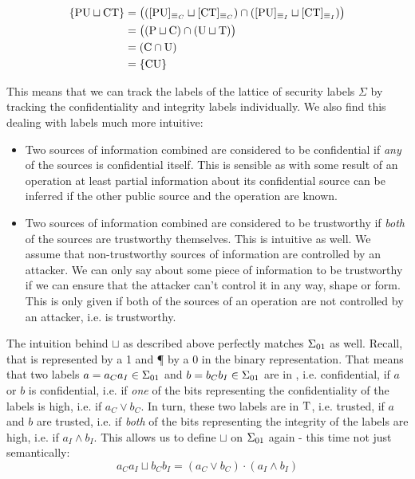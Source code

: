\begin{example}
    \begin{align*}
        \{ \text{PU} \sqcup \text{CT} \} &= \big(([\text{PU}]_{\equiv_C} \sqcup [\text{CT}]_{\equiv_C}) \cap ([\text{PU}]_{\equiv_I} \sqcup [\text{CT}]_{\equiv_I}) \big) \\
        &= \big((\text{P} \sqcup \text{C}) \cap (\text{U} \sqcup \text{T}) \big) \\
        &= (\text{C} \cap \text{U}) \\
        &= \{ \text{CU} \}
    \end{align*}
\end{example}

This means that we can track the labels of the lattice of security labels $ \Sigma $ by tracking the confidentiality and integrity labels individually.
We also find this dealing with labels much more intuitive:
\begin{itemize}
    \item Two sources of information combined are considered to be confidential if \textit{any} of the sources is confidential itself.
    This is sensible as with some result of an operation at least partial information about its confidential source can be inferred if the other public source and the operation are known.
    \item Two sources of information combined are considered to be trustworthy if \textit{both} of the sources are trustworthy themselves.
    This is intuitive as well.
    We assume that non-trustworthy sources of information are controlled by an attacker.
    We can only say about some piece of information to be trustworthy if we can ensure that the attacker can't control it in any way, shape or form.
    This is only given if both of the sources of an operation are not controlled by an attacker, i.e. is trustworthy.
\end{itemize}

The intuition behind $ \sqcup $ as described above perfectly matches $ \Sigma_{01} $ as well.
Recall, that \C{} is represented by a 1 and \P{} by a 0 in the binary representation.
That means that two labels $ a = a_Ca_I \in \Sigma_{01} $ and $ b = b_Cb_I \in \Sigma_{01} $ are in \C{}, i.e. confidential, if $ a $ or $ b $ is confidential, i.e. if \textit{one} of the bits representing the confidentiality of the labels is high, i.e. if $ a_C \lor b_C $.
In turn, these two labels are in $ \text{T} $, i.e. trusted, if $ a $ and $ b $ are trusted, i.e. if \textit{both} of the bits representing the integrity of the labels are high, i.e. if $ a_I \land b_I $.
This allows us to define $ \sqcup $ on $ \Sigma_{01} $ again - this time not just semantically:
\begin{equation*}
    a_C a_I \sqcup b_C b_I = (a_C \lor b_C) \cdot (a_I \land b_I)
\end{equation*}

